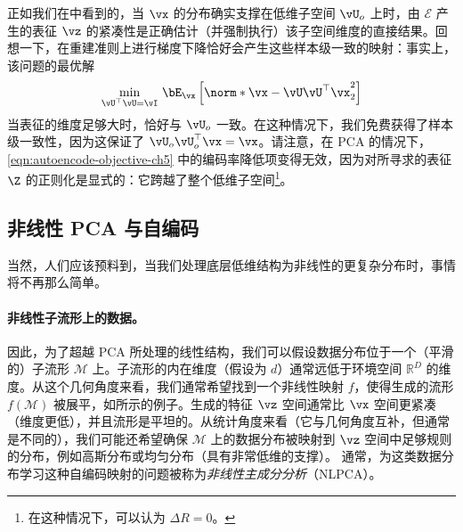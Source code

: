 \documentclass[../../book-main_zh.tex]{subfiles}
\begin{document}
正如我们在中看到的，当 $\vx$ 的分布确实支撑在低维子空间 $\vU_o$ 上时，由 $\mathcal{E}$ 产生的表征 $\vz$ 的紧凑性是正确估计（并强制执行）该子空间维度的直接结果。回想一下，在重建准则上进行梯度下降恰好会产生这些样本级一致的映射：事实上，该问题的最优解
\begin{equation}\label{eq:pca-reconstruction-ch5}
    \min_{\vU^\top \vU = \vI}\, \bE_{\vx}\left[\norm*{\vx
    - \vU\vU^\top \vx}_2^2\right]
\end{equation}
当表征的维度足够大时，恰好与 $\vU_o$ 一致。在这种情况下，我们免费获得了样本级一致性，因为这保证了 $\vU_o\vU_o^\top \vx = \vx$。请注意，在 PCA 的情况下，\eqref{eqn:autoencode-objective-ch5} 中的编码率降低项变得无效，因为对所寻求的表征 $\Z$ 的正则化是显式的：它跨越了整个低维子空间\footnote{在这种情况下，可以认为 $\Delta R = 0$。}。

\subsection{非线性 PCA 与自编码}\label{sub:nonlinear-pca}\label{sec:NLPCA}
当然，人们应该预料到，当我们处理底层低维结构为非线性的更复杂分布时，事情将不再那么简单。

\paragraph{非线性子流形上的数据。} 因此，为了超越 PCA 所处理的线性结构，我们可以假设数据分布位于一个（平滑的）子流形 $\mathcal{M}$ 上。子流形的内在维度（假设为 $d$）通常远低于环境空间 $\mathbb{R}^D$ 的维度。从这个几何角度来看，我们通常希望找到一个非线性映射 $f$，使得生成的流形 $f(\mathcal{M})$ 被展平，如所示的例子。生成的特征 $\vz$ 空间通常比 $\vx$ 空间更紧凑（维度更低），并且流形是平坦的。从统计角度来看（它与几何角度互补，但通常是不同的），我们可能还希望确保 $\mathcal{M}$ 上的数据分布被映射到 $\vz$ 空间中足够规则的分布，例如高斯分布或均匀分布（具有非常低维的支撑）。
通常，为这类数据分布学习这种自编码映射的问题被称为{\em 非线性主成分分析}（NLPCA）。
\end{document}
